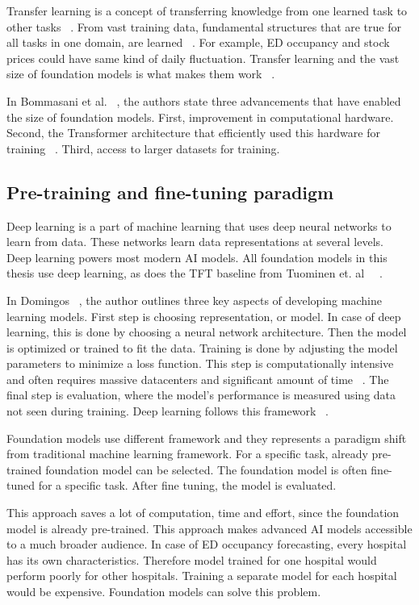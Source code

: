 Transfer learning is a concept of transferring knowledge from one learned task to other tasks ~\cite{Raffel2020T5}. From vast training data, fundamental structures that are true for all tasks in one domain, are learned ~\cite{Raffel2020T5}. For example, ED occupancy and stock prices could have same kind of daily fluctuation. Transfer learning and the vast size of foundation models is what makes them work ~\cite{bommasani2022opportunitiesrisksfoundationmodels}.

In Bommasani et al. ~\cite{bommasani2022opportunitiesrisksfoundationmodels}, the authors state three advancements that have enabled the size of foundation models. First, improvement in computational hardware. Second, the Transformer architecture that efficiently used this hardware for training ~\cite{vaswani_attention_2017}. Third, access to larger datasets for training.

\subsection{Pre-training and fine-tuning paradigm}

Deep learning is a part of machine learning that uses deep neural networks to learn from data.
These networks learn data representations at several levels. ~\cite{lecun2015deep}
Deep learning powers most modern AI models.
All foundation models in this thesis use deep learning, as does the TFT baseline from Tuominen et. al ~\cite{tuominen_forecasting_2024}~\cite{lim2021temporal}.

In Domingos ~\cite{Domingos2012Few}, the author outlines three key aspects of developing machine learning models.
First step is choosing representation, or model. In case of deep learning, this is done by choosing a neural network architecture.
Then the model is optimized or trained to fit the data. Training is done by adjusting the model parameters to minimize a loss function.
This step is computationally intensive and often requires massive datacenters and significant amount of time ~\cite{bommasani2022opportunitiesrisksfoundationmodels}.
The final step is evaluation, where the model's performance is measured using data not seen during training.
Deep learning follows this framework ~\cite{lecun2015deep}.

Foundation models use different framework and they represents a paradigm shift from traditional machine learning framework. For a specific task, already pre-trained foundation model can be selected.
The foundation model is often fine-tuned for a specific task. After fine tuning, the model is evaluated. ~\cite{bommasani2022opportunitiesrisksfoundationmodels}

This approach saves a lot of computation, time and effort, since the foundation model is already pre-trained. This approach makes advanced AI models accessible to a much broader audience.
In case of ED occupancy forecasting, every hospital has its own characteristics. Therefore model trained for one hospital would perform poorly for other hospitals.
Training a separate model for each hospital would be expensive. Foundation models can solve this problem.


